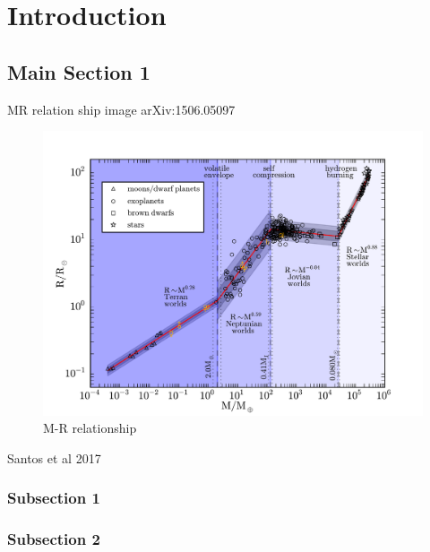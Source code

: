 \chapter{Introduction}  %
\label{cha:introduction}


\section{Main Section 1}


MR relation ship image arXiv:1506.05097~\citet{chen_probabilistic_2016}

\begin{figure}
    \centering
    \includegraphics[width=0.7\linewidth]{./figures/introduction/plt_overlay_add.pdf}
    \caption{M-R relationship~\citet{chen_probabilistic_2016}}
    \label{fig:pltoverlayadd}
\end{figure}

Santos et al 2017 

\subsection{Subsection 1}



\subsection{Subsection 2}

